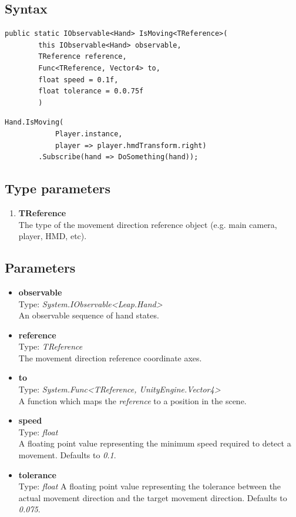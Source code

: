 \documentclass[12pt,a4paper,twoside]{report}
\begin{document}
\subsection{Syntax}
\begin{lstlisting}[caption=Declaration]
    public static IObservable<Hand> IsMoving<TReference>(
        this IObservable<Hand> observable,
        TReference reference,
        Func<TReference, Vector4> to,
        float speed = 0.1f,
        float tolerance = 0.0.75f
        )
\end{lstlisting}

\begin{lstlisting}[caption=Usage example]
    Hand.IsMoving(
            Player.instance,
            player => player.hmdTransform.right)
        .Subscribe(hand => DoSomething(hand));
\end{lstlisting}

\subsection{Type parameters}
\begin{enumerate}
    \item \textbf{TReference}\\
    The type of the movement direction reference object (e.g. main camera, player, HMD, etc).
\end{enumerate}

\subsection{Parameters}
\begin{itemize}
    \item \textbf{observable}\\
        Type: \textit{System.IObservable<Leap.Hand>}\\
        An observable sequence of hand states.
    \item \textbf{reference}\\
        Type: \textit{TReference}\\
        The movement direction reference coordinate axes.
    \item \textbf{to}\\
        Type: \textit{System.Func<TReference, UnityEngine.Vector4>}\\
        A function which maps the \textit{reference} to a position in the scene.
    \item \textbf{speed}\\
        Type: \textit{float}\\
        A floating point value representing the minimum speed required to detect a movement. Defaults to
        \textit{0.1}.
        
    \item \textbf{tolerance}\\
        Type: \textit{float}
        A floating point value representing the tolerance between the actual movement direction and the target movement direction. Defaults to \textit{0.075}.
\end{itemize}
\end{document}
